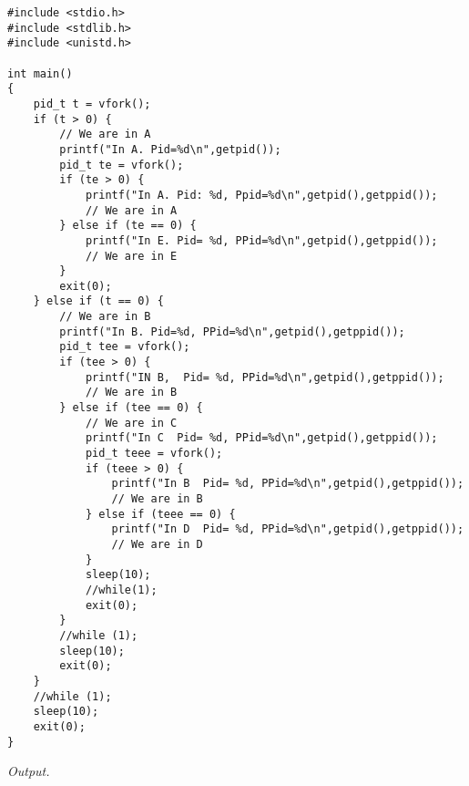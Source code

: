 \documentclass[12pt]{article}
\begin{document}
\begin{lstlisting}
#include <stdio.h>
#include <stdlib.h>
#include <unistd.h>

int main()
{
	pid_t t = vfork();
	if (t > 0) {
		// We are in A
		printf("In A. Pid=%d\n",getpid());
		pid_t te = vfork();
		if (te > 0) {
			printf("In A. Pid: %d, Ppid=%d\n",getpid(),getppid());
			// We are in A
		} else if (te == 0) {
			printf("In E. Pid= %d, PPid=%d\n",getpid(),getppid());
			// We are in E
		}
		exit(0);
	} else if (t == 0) {
		// We are in B
		printf("In B. Pid=%d, PPid=%d\n",getpid(),getppid());
		pid_t tee = vfork();
		if (tee > 0) {
			printf("IN B,  Pid= %d, PPid=%d\n",getpid(),getppid());
			// We are in B
		} else if (tee == 0) {
			// We are in C
			printf("In C  Pid= %d, PPid=%d\n",getpid(),getppid());
			pid_t teee = vfork();
			if (teee > 0) {
				printf("In B  Pid= %d, PPid=%d\n",getpid(),getppid());
				// We are in B
			} else if (teee == 0) {
				printf("In D  Pid= %d, PPid=%d\n",getpid(),getppid());
				// We are in D
			}
			sleep(10);
			//while(1);
			exit(0);
		}
		//while (1);
		sleep(10);
		exit(0);
	}
	//while (1);
	sleep(10);
	exit(0);
}
\end{lstlisting}

\textit{Output.}
\begin{lstlisting}
\end{lstlisting}
\end{document}
